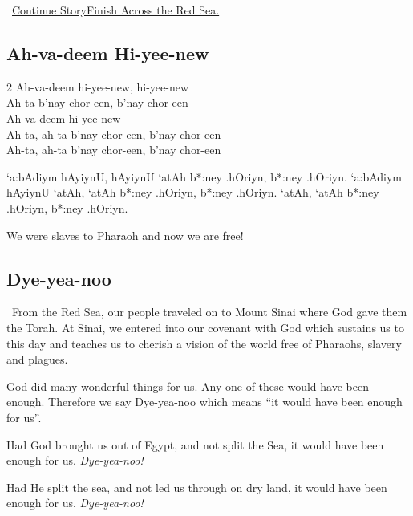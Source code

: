 \documentclass[12pt]{article}
\newenvironment{hebrewPrayer}
    {\begin{cjhebrew}
     \Large
    }
    {
    \end{cjhebrew}
    }
\newenvironment{hebrewTransliteration}{}{\par}
\newenvironment{hebrewTranslation}{}{\par}
\newcommand{\god}{God}
\newcommand{\inlineSederAction}[1]{\faHandORight{}~\underline{#1}}
\newcommand{\sederAction}[1]{\inlineSederAction{#1}\par}
\newcommand{\newReading}{\faBook{}\ }
\begin{document}
\sederAction{Continue Story\textemdash{}Finish Across the Red Sea.}

\begin{minipage}[t]{\textwidth}
\subsection*{Ah-va-deem Hi-yee-new}
\begin{multicols}{2}
\begin{hebrewTransliteration}
    Ah-va-deem hi-yee-new, hi-yee-new \\
    Ah-ta b'nay chor-een, b'nay chor-een \\
    Ah-va-deem hi-yee-new\\
    Ah-ta, ah-ta b'nay chor-een, b'nay chor-een \\
    Ah-ta, ah-ta b'nay chor-een, b'nay chor-een
\end{hebrewTransliteration}
\vfill\null
\columnbreak
\begin{hebrewPrayer}
    `a:bAdiym hAyiynU\textrm{,} hAyiynU `atAh b*:ney .hOriyn\textrm{,} b*:ney .hOriyn\textrm{.} `a:bAdiym hAyiynU `atAh\textrm{,} `atAh b*:ney .hOriyn\textrm{,} b*:ney .hOriyn\textrm{.} `atAh\textrm{,} `atAh b*:ney .hOriyn\textrm{,} b*:ney .hOriyn\textrm{.}
\end{hebrewPrayer}
\end{multicols}
\begin{hebrewTranslation}
    We were slaves to Pharaoh and now we are free!
\end{hebrewTranslation}
\end{minipage}

\subsection*{Dye-yea-noo}
\newReading From the Red Sea, our people traveled on to Mount Sinai where \god{} gave them the Torah. At Sinai, we entered into our covenant with {\god} which sustains us to this day and teaches us to cherish a vision of the world free of Pharaohs, slavery and plagues.

{\god} did many wonderful things for us. Any one of these would have been enough. Therefore we say Dye-yea-noo which means ``it would have been enough for us''.

Had {\god} brought us out of Egypt, and not split the Sea, it would have been enough for us. \textit{Dye-yea-noo!}

Had He split the sea, and not led us through on dry land, it would have been enough for us. \textit{Dye-yea-noo!}
\end{document}
